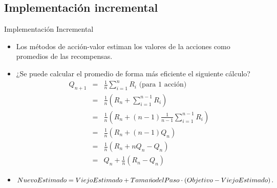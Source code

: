 \documentclass[10pt, envcountsect, handout, aspectratio=1610, hyperref={hypertexnames=true}]{beamer}
\begin{document}
\subsection{Implementación incremental}


\begin{frame}{Implementación Incremental}

\begin{itemize}
\item Los métodos de acción-valor estiman los valores de la acciones como promedios de las recompensas.

\item ¿Se puede calcular el promedio de forma más eficiente el siguiente cálculo?
{\small
\begin{eqnarray}
 Q_{n+1}& = & \frac{1}{n}\sum_{i=1}^n R_i  \mbox{ (para 1 acción)}\nonumber \\
		& = & \frac{1}{n}\left( R_n + \sum_{i=1}^{n-1} R_i \right)  \nonumber \\
		& = & \frac{1}{n}\left( R_n + (n-1) \frac{1}{n-1} \sum_{i=1}^{n-1} R_i \right)  \nonumber \\
		& = & \frac{1}{n}\left( R_n + (n-1)  Q_n  \right)  \nonumber \\
		& = & \frac{1}{n}\left( R_n + n Q_n - Q_n  \right)  \nonumber \\
		& = & Q_n + \frac{1}{n} \left( R_n - Q_n \right) \label{eq:ActualizacionIncremental}
\end{eqnarray}
}

\item ${Nuevo Estimado} = {Viejo Estimado} + {Tama\text{\itñ}o del Paso} \cdot \left( {Objetivo} - {Viejo Estimado} \right).$
\end{itemize}


\end{frame}



\end{document}
